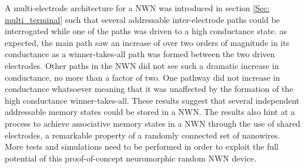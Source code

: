 A multi-electrode architecture for a NWN was introduced in section \ref{Sec: multi_terminal} such that several addressable inter-electrode paths could be interrogated while one of the paths was driven to a high conductance state. as expected, the main path saw an increase of over two orders of magnitude in its conductance as a winner-takes-all path was formed between the two driven electrodes. Other paths in the NWN did not see such a dramatic increase in conductance, no more than a factor of two. One pathway did not increase in conductance whatsoever meaning that it was unaffected by the formation of the high conductance winner-takes-all. These results suggest that several independent addressable memory states could be stored in a NWN. The results also hint at a process to achieve associative memory states in a NWN through the use of shared electrodes, a remarkable property of a randomly connected set of nanowires. More tests and simulations need to be performed in order to exploit the full potential of this proof-of-concept neuromorphic random NWN device.
